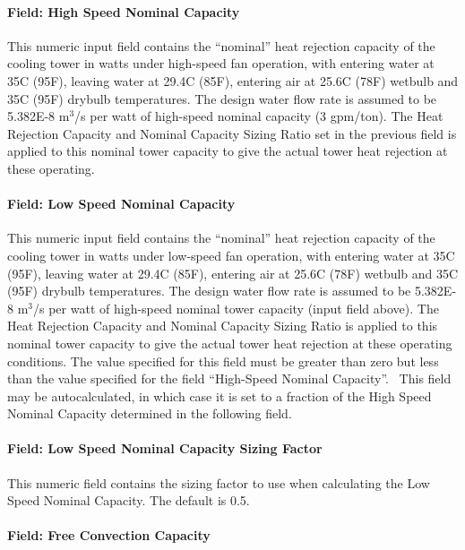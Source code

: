 \paragraph{Field: High Speed Nominal Capacity}\label{field-high-speed-nominal-capacity}

This numeric input field contains the ``nominal'' heat rejection capacity of the cooling tower in watts under high-speed fan operation, with entering water at 35C (95F), leaving water at 29.4C (85F), entering air at 25.6C (78F) wetbulb and 35C (95F) drybulb temperatures. The design water flow rate is assumed to be 5.382E-8 m\(^{3}\)/s per watt of high-speed nominal capacity (3 gpm/ton). The Heat Rejection Capacity and Nominal Capacity Sizing Ratio set in the previous field is applied to this nominal tower capacity to give the actual tower heat rejection at these operating.

\paragraph{Field: Low Speed Nominal Capacity}\label{field-low-speed-nominal-capacity}

This numeric input field contains the ``nominal'' heat rejection capacity of the cooling tower in watts under low-speed fan operation, with entering water at 35C (95F), leaving water at 29.4C (85F), entering air at 25.6C (78F) wetbulb and 35C (95F) drybulb temperatures. The design water flow rate is assumed to be 5.382E-8 m\(^{3}\)/s per watt of high-speed nominal tower capacity (input field above). The Heat Rejection Capacity and Nominal Capacity Sizing Ratio is applied to this nominal tower capacity to give the actual tower heat rejection at these operating conditions. The value specified for this field must be greater than zero but less than the value specified for the field ``High-Speed Nominal Capacity''.~ This field may be autocalculated, in which case it is set to a fraction of the High Speed Nominal Capacity determined in the following field.

\paragraph{Field: Low Speed Nominal Capacity Sizing Factor}\label{field-low-speed-nominal-capacity-sizing-factor}

This numeric field contains the sizing factor to use when calculating the Low Speed Nominal Capacity. The default is 0.5.

\paragraph{Field: Free Convection Capacity}\label{field-free-convection-capacity-1}

